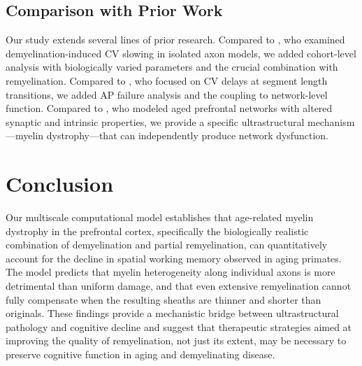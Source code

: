 \documentclass[11pt]{article}
\begin{document}
\subsection{Comparison with Prior Work}

Our study extends several lines of prior research. Compared to \citet{stephanova2005}, who examined demyelination-induced CV slowing in isolated axon models, we added cohort-level analysis with biologically varied parameters and the crucial combination with remyelination. Compared to \citet{scurfield2018}, who focused on CV delays at segment length transitions, we added AP failure analysis and the coupling to network-level function. Compared to \citet{ibanez2020}, who modeled aged prefrontal networks with altered synaptic and intrinsic properties, we provide a specific ultrastructural mechanism---myelin dystrophy---that can independently produce network dysfunction.

\section{Conclusion}

Our multiscale computational model establishes that age-related myelin dystrophy in the prefrontal cortex, specifically the biologically realistic combination of demyelination and partial remyelination, can quantitatively account for the decline in spatial working memory observed in aging primates. The model predicts that myelin heterogeneity along individual axons is more detrimental than uniform damage, and that even extensive remyelination cannot fully compensate when the resulting sheaths are thinner and shorter than originals. These findings provide a mechanistic bridge between ultrastructural pathology and cognitive decline and suggest that therapeutic strategies aimed at improving the quality of remyelination, not just its extent, may be necessary to preserve cognitive function in aging and demyelinating disease.



\end{document}
